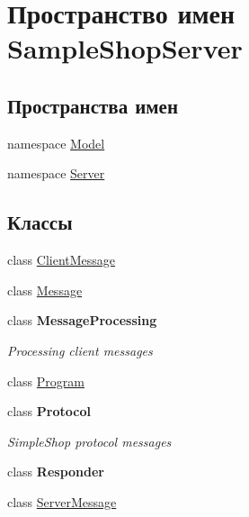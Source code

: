 \hypertarget{namespace_sample_shop_server}{}\section{Пространство имен Sample\+Shop\+Server}
\label{namespace_sample_shop_server}
\subsection*{Пространства имен}
\begin{DoxyCompactItemize}
\item 
namespace \hyperlink{namespace_sample_shop_server_1_1_model}{Model}
\item 
namespace \hyperlink{namespace_sample_shop_server_1_1_server}{Server}
\end{DoxyCompactItemize}
\subsection*{Классы}
\begin{DoxyCompactItemize}
\item 
class \hyperlink{class_sample_shop_server_1_1_client_message}{Client\+Message}
\item 
class \hyperlink{class_sample_shop_server_1_1_message}{Message}
\item 
class {\bfseries Message\+Processing}
\begin{DoxyCompactList}\small\item\em Processing client messages \end{DoxyCompactList}\item 
class \hyperlink{class_sample_shop_server_1_1_program}{Program}
\item 
class {\bfseries Protocol}
\begin{DoxyCompactList}\small\item\em Simple\+Shop protocol messages \end{DoxyCompactList}\item 
class {\bfseries Responder}
\item 
class \hyperlink{class_sample_shop_server_1_1_server_message}{Server\+Message}
\end{DoxyCompactItemize}
